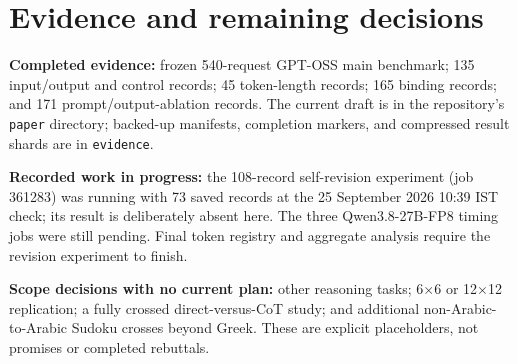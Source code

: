 \documentclass[10pt,a4paper]{article}
\begin{document}
\section*{Evidence and remaining decisions}
\noindent\textbf{Completed evidence:} frozen 540-request GPT-OSS main benchmark; 135 input/output and control records; 45 token-length records; 165 binding records; and 171 prompt/output-ablation records. The current draft is in the repository's \texttt{paper} directory; backed-up manifests, completion markers, and compressed result shards are in \texttt{evidence}.

\medskip
\noindent\textbf{Recorded work in progress:} the 108-record self-revision experiment (job 361283) was running with 73 saved records at the 25 September 2026 10:39 IST check; its result is deliberately absent here. The three Qwen3.8-27B-FP8 timing jobs were still pending. Final token registry and aggregate analysis require the revision experiment to finish.

\medskip
\noindent\textbf{Scope decisions with no current plan:} other reasoning tasks; 6$\times$6 or 12$\times$12 replication; a fully crossed direct-versus-CoT study; and additional non-Arabic-to-Arabic Sudoku crosses beyond Greek. These are explicit placeholders, not promises or completed rebuttals.
\end{document}
